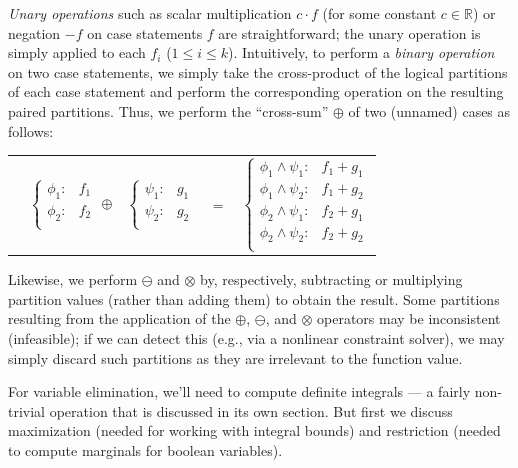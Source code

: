 \documentclass[letterpaper]{article}
\begin{document}
\emph{Unary operations} such as scalar multiplication $c\cdot f$ (for
some constant $c \in \mathbb{R}$) or negation $-f$ on case statements
$f$ are straightforward; the unary operation is simply applied to each
$f_i$ ($1 \leq i \leq k$). Intuitively, to perform a \emph{binary
  operation} on two case statements, we simply take the cross-product
of the logical partitions of each case statement and perform the
corresponding operation on the resulting paired partitions.  Thus, we 
perform the ``cross-sum'' $\oplus$ of two (unnamed) cases as follows:
\vspace{-4mm}
{\footnotesize 
\begin{center}
\begin{tabular}{r c c c l}
&
\hspace{-6mm} 
  $\begin{cases}
    \phi_1: & f_1 \\ 
    \phi_2: & f_2 \\ 
  \end{cases}$
$\oplus$
&
\hspace{-4mm}
  $\begin{cases}
    \psi_1: & g_1 \\ 
    \psi_2: & g_2 \\ 
  \end{cases}$
&
\hspace{-2mm} 
$ = $
&
\hspace{-2mm}
  $\begin{cases}
  \phi_1 \wedge \psi_1: & f_1 + g_1 \\ 
  \phi_1 \wedge \psi_2: & f_1 + g_2 \\ 
  \phi_2 \wedge \psi_1: & f_2 + g_1 \\ 
  \phi_2 \wedge \psi_2: & f_2 + g_2 \\ 
  \end{cases}$
\end{tabular}
\end{center}
}
\normalsize
Likewise, we perform $\ominus$ and $\otimes$ by,
respectively, subtracting or multiplying partition values (rather than
adding them) to obtain the result.  
Some partitions resulting from
the application of the $\oplus$, $\ominus$, and $\otimes$ operators
may be inconsistent (infeasible); if we can detect this (e.g., via
a nonlinear constraint solver), we may simply discard such 
partitions as they are irrelevant to the function value.

For variable elimination, we'll need to compute definite integrals
 --- a fairly non-trivial operation
that is discussed in its own section.  But first we discuss 
maximization (needed for working with integral bounds) and restriction
(needed to compute marginals for boolean variables).
\end{document}
